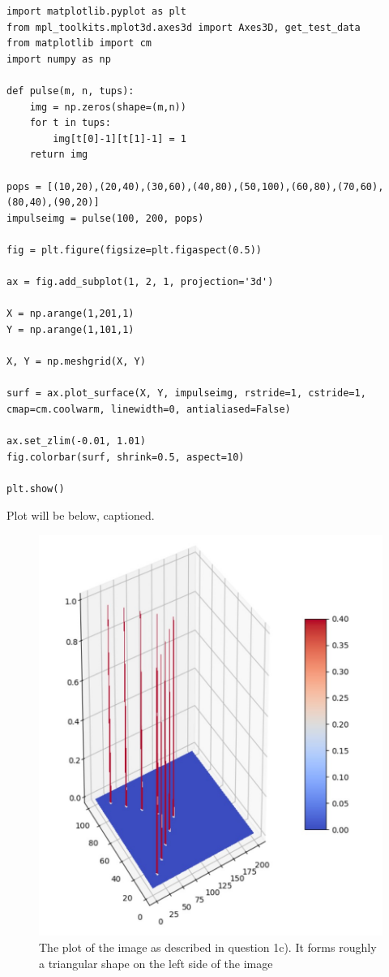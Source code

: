 \documentclass{article}
\begin{document}
\begin{lstlisting}
import matplotlib.pyplot as plt
from mpl_toolkits.mplot3d.axes3d import Axes3D, get_test_data
from matplotlib import cm
import numpy as np

def pulse(m, n, tups):
	img = np.zeros(shape=(m,n))
	for t in tups:
		img[t[0]-1][t[1]-1] = 1
	return img

pops = [(10,20),(20,40),(30,60),(40,80),(50,100),(60,80),(70,60),(80,40),(90,20)]
impulseimg = pulse(100, 200, pops)

fig = plt.figure(figsize=plt.figaspect(0.5))

ax = fig.add_subplot(1, 2, 1, projection='3d')

X = np.arange(1,201,1)
Y = np.arange(1,101,1)

X, Y = np.meshgrid(X, Y)

surf = ax.plot_surface(X, Y, impulseimg, rstride=1, cstride=1, cmap=cm.coolwarm, linewidth=0, antialiased=False)

ax.set_zlim(-0.01, 1.01)
fig.colorbar(surf, shrink=0.5, aspect=10)

plt.show()
\end{lstlisting}

\noindent
Plot will be below, captioned.

\begin{figure}[h!]
    \centering
    \includegraphics[scale=0.5]{tri1.jpg}
    \caption{The plot of the image as described in question 1c). It forms roughly a triangular shape on the left side of the image}
    \label{fig:my_label}
\end{figure}
\end{document}
